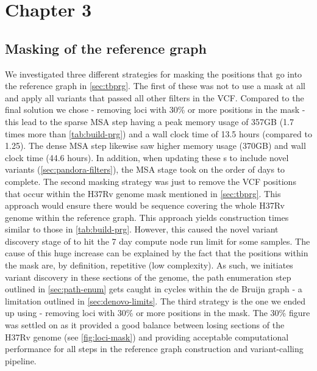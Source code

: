 \chapter{Chapter 3}

\section{Masking of the \mtb{} reference graph}
\label{app:mask}

We investigated three different strategies for masking the positions that go into the \mtb{} reference graph in \autoref{sec:tbprg}. The first of these was not to use a mask at all and apply all variants that passed all other filters in the \cryptic{} VCF. Compared to the final solution we chose - removing loci with 30\% or more positions in the mask - this lead to the sparse \prg{} MSA step having a peak memory usage of 357GB (1.7 times more than \autoref{tab:build-prg}) and a wall clock time of 13.5 hours (compared to 1.25). The dense \prg{} MSA step likewise saw higher memory usage (370GB) and wall clock time (44.6 hours). In addition, when updating these \prg{}s to include novel variants (\autoref{sec:pandora-filters}), the MSA stage took on the order of days to complete. 
The second masking strategy was just to remove the VCF positions that occur within the H37Rv genome mask mentioned in \autoref{sec:tbprg}. This approach would ensure there would be sequence covering the whole H37Rv genome within the reference graph. This approach yields construction times similar to those in \autoref{tab:build-prg}. However, this caused the novel variant discovery stage of \pandora{} to hit the 7 day compute node run limit for some samples. The cause of this huge increase can be explained by the fact that the positions within the mask are, by definition, repetitive (low complexity). As such, we \pandora{} initiates \denovo{} variant discovery in these sections of the genome, the path enumeration step outlined in \autoref{sec:path-enum} gets caught in cycles within the de Bruijn graph - a limitation outlined in \autoref{sec:denovo-limits}.
The third strategy is the one we ended up using - removing loci with 30\% or more positions in the mask. The 30\% figure was settled on as it provided a good balance between losing sections of the H37Rv genome (see \autoref{fig:loci-mask}) and providing acceptable computational performance for all steps in the reference graph construction and \pandora{} variant-calling pipeline.

